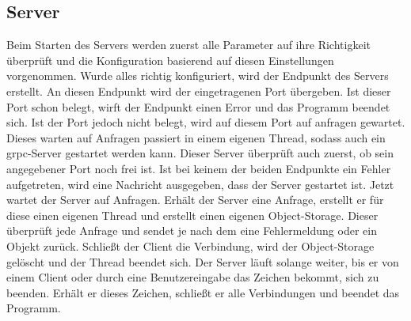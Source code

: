 \subsection{Server}
Beim Starten des Servers werden zuerst alle Parameter auf ihre Richtigkeit überprüft und die Konfiguration basierend auf diesen Einstellungen vorgenommen. Wurde alles richtig konfiguriert, wird der Endpunkt des Servers erstellt. An diesen Endpunkt wird der eingetragenen Port übergeben. Ist dieser Port schon belegt, wirft der Endpunkt einen Error und das Programm beendet sich. Ist der Port jedoch nicht belegt, wird auf diesem Port auf anfragen gewartet. Dieses warten auf Anfragen passiert in einem eigenen Thread, sodass auch ein grpc-Server gestartet werden kann. Dieser Server überprüft auch zuerst, ob sein angegebener Port noch frei ist. Ist bei keinem der beiden Endpunkte ein Fehler aufgetreten, wird eine Nachricht ausgegeben, dass der Server gestartet ist. Jetzt wartet der Server auf Anfragen. Erhält der Server eine Anfrage, erstellt er für diese einen eigenen Thread und erstellt einen eigenen Object-Storage. Dieser überprüft jede Anfrage und sendet je nach dem eine Fehlermeldung oder ein Objekt zurück. Schließt der Client die Verbindung, wird der Object-Storage gelöscht und der Thread beendet sich. Der Server läuft solange weiter, bis er von einem Client oder durch eine Benutzereingabe das Zeichen bekommt, sich zu beenden. Erhält er dieses Zeichen, schließt er alle Verbindungen und beendet das Programm.